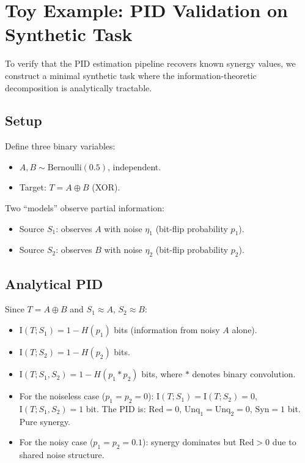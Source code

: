 \documentclass[11pt,a4paper]{article}
\theoremstyle{remark}
\newcommand{\Syn}{\mathrm{Syn}}
\newcommand{\Red}{\mathrm{Red}}
\newcommand{\Unq}{\mathrm{Unq}}
\newcommand{\MI}{\mathrm{I}}
\begin{document}
\section{Toy Example: PID Validation on Synthetic Task}
\label{sec:toy}

To verify that the PID estimation pipeline recovers known synergy values, we construct a minimal synthetic task where the information-theoretic decomposition is analytically tractable.

\subsection{Setup}

Define three binary variables:
\begin{itemize}
  \item $A, B \sim \text{Bernoulli}(0.5)$, independent.
  \item Target: $T = A \oplus B$ (XOR).
\end{itemize}
Two ``models'' observe partial information:
\begin{itemize}
  \item Source $S_1$: observes $A$ with noise $\eta_1$ (bit-flip probability $p_1$).
  \item Source $S_2$: observes $B$ with noise $\eta_2$ (bit-flip probability $p_2$).
\end{itemize}

\subsection{Analytical PID}

Since $T = A \oplus B$ and $S_1 \approx A$, $S_2 \approx B$:
\begin{itemize}
  \item $\MI(T; S_1) = 1 - H(p_1)$ bits (information from noisy $A$ alone).
  \item $\MI(T; S_2) = 1 - H(p_2)$ bits.
  \item $\MI(T; S_1, S_2) = 1 - H(p_1 * p_2)$ bits, where $*$ denotes binary convolution.
  \item For the noiseless case ($p_1 = p_2 = 0$): $\MI(T; S_1) = \MI(T; S_2) = 0$, $\MI(T; S_1, S_2) = 1$ bit. The PID is: $\Red = 0$, $\Unq_1 = \Unq_2 = 0$, $\Syn = 1$ bit. Pure synergy.
  \item For the noisy case ($p_1 = p_2 = 0.1$): synergy dominates but $\Red > 0$ due to shared noise structure.
\end{itemize}
\end{document}
